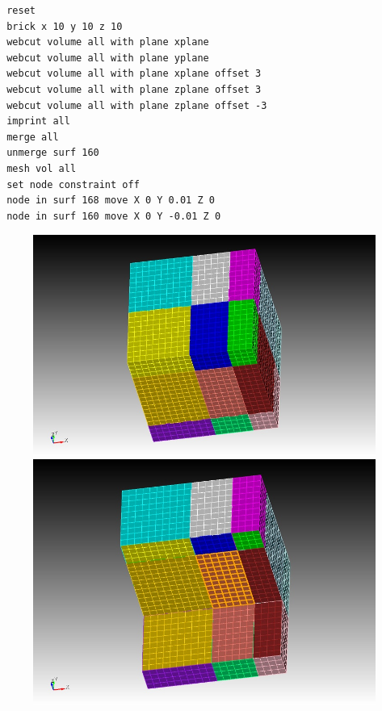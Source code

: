 {\footnotesize
\begin{verbatim}
 reset
 brick x 10 y 10 z 10
 webcut volume all with plane xplane
 webcut volume all with plane yplane
 webcut volume all with plane xplane offset 3
 webcut volume all with plane zplane offset 3
 webcut volume all with plane zplane offset -3
 imprint all
 merge all
 unmerge surf 160
 mesh vol all
 set node constraint off
 node in surf 168 move X 0 Y 0.01 Z 0
 node in surf 160 move X 0 Y -0.01 Z 0
\end{verbatim}
}

\begin{figure}[htbp]
\begin{centering}
\includegraphics[scale=0.3]{figures/faultmesh.jpg} \\
\includegraphics[scale=0.3]{figures/surf168.jpg}

\end{centering}
\end{figure}
